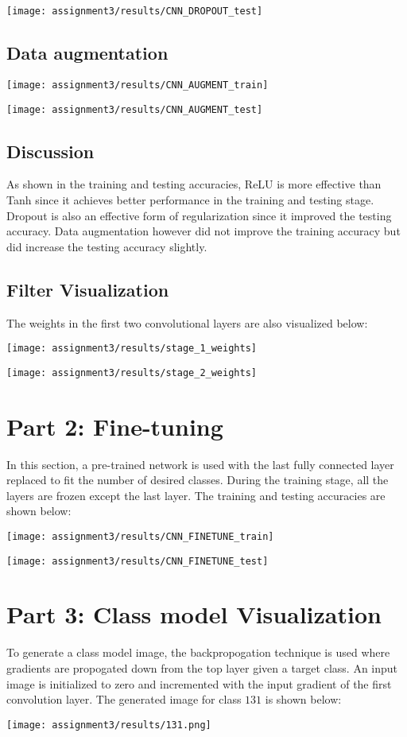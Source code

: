 \documentclass[twoside,12pt]{article}
\newcommand{\imsize}{0.5\linewidth}
\begin{document}
\texttt{[image: assignment3/results/CNN\_DROPOUT\_test]}

\subsection*{Data augmentation}
\texttt{[image: assignment3/results/CNN\_AUGMENT\_train]}

\texttt{[image: assignment3/results/CNN\_AUGMENT\_test]}

\subsection*{Discussion}

As shown in the training and testing accuracies, ReLU is more effective than Tanh since it achieves
better performance in the training and testing stage. Dropout is also an effective form of regularization
since it improved the testing accuracy. Data augmentation however did not improve the training accuracy but
did increase the testing accuracy slightly.

\subsection*{Filter Visualization}

The weights in the first two convolutional layers are also visualized below:

\texttt{[image: assignment3/results/stage\_1\_weights]}

\texttt{[image: assignment3/results/stage\_2\_weights]}


\section*{Part 2: Fine-tuning}

In this section, a pre-trained network is used with the last fully connected layer
replaced to fit the number of desired classes. During the training stage, all the layers are frozen
except the last layer. The training and testing accuracies are shown below:

\texttt{[image: assignment3/results/CNN\_FINETUNE\_train]}

\texttt{[image: assignment3/results/CNN\_FINETUNE\_test]}

\section*{Part 3: Class model Visualization}

To generate a class model image, the backpropogation technique is used where gradients are propogated down from the
top layer given a target class. 
An input image is initialized to zero and incremented with the input gradient of the first
convolution layer. The generated image for class $131$ is shown below:

\texttt{[image: assignment3/results/131.png]}
\end{document}
